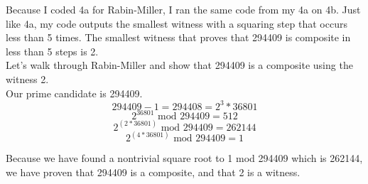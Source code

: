\documentclass[11pt, solution, letterpaper]{format}
\begin{document}
Because I coded 4a for Rabin-Miller, I ran the same code from my 4a on 4b. Just like 4a, my code outputs the smallest witness with a squaring step that occurs less than 5 times. The smallest witness that proves that 294409 is composite in less than 5 steps is 2.\\

Let's walk through Rabin-Miller and show that 294409 is a composite using the witness 2.\\
Our prime candidate is 294409. \\
$$294409 - 1 = 294408 = 2^3*36801$$
$$2^36801 \text{ mod } 294409 = 512$$
$$2^(2*36801) \text{ mod }  294409 = 262144$$
$$2^(4*36801) \text{ mod }  294409 = 1$$

Because we have found a nontrivial square root to 1 mod 294409 which is 262144, we have proven that 294409 is a composite, and that 2 is a witness.\\
\end{document}
